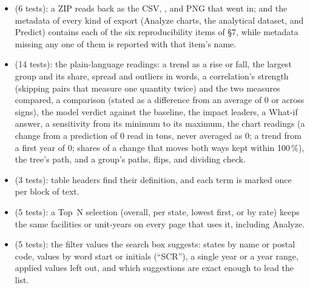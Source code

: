 \documentclass[11pt,a4paper]{article}
\begin{document}
\begin{itemize}
        maximum by the step, the baseline included once, a reversed range and a zero, negative,
        or empty step corrected and reported, the point limit); scenarios (scaled load and heat
        input, SCR and fuel set, never below zero, described in words) and the inputs each
        changes, named with their new and baseline values; group totals, as reported and under a
        scenario, equal to the sum of the units' predictions, and the group sensitivity and
        category curves; the tree's thresholds, between which its prediction is flat, and its
        path in words; a group's tree summary (every unit in one leaf as reported and with the
        change, leaf tons equal to the tree's totals, flips that account for every moved unit and
        the whole change, splits with units on both sides); what a scenario sets across a group;
        the years a What-if can use; and the signed and absolute error per fuel.
  \item {} (6 tests): a ZIP reads back as the CSV, ,
        and PNG that went in; and the metadata of every kind of export (Analyze charts, the
        analytical dataset, and Predict) contains each of the six reproducibility items of
        \S7, while metadata missing any one of them is reported with that item's name.
  \item {} (14 tests): the plain-language readings: a trend as a rise or
        fall, the largest group and its share, spread and outliers in words, a correlation's
        strength (skipping pairs that measure one quantity twice) and the two measures compared,
        a comparison (stated as a difference from an average of 0 or across signs), the model verdict against the baseline, the impact leaders, a What-if
        answer, a sensitivity from its minimum to its maximum, the chart readings (a change from a
        prediction of 0 read in tons, never averaged as 0; a trend from a first year of 0; shares of a change that moves both ways
        kept within 100\,\%), the tree's path, and a group's paths, flips, and dividing check.
  \item {} (3 tests): table headers find their definition, and each term is
        marked once per block of text.
  \item {} (5 tests): a Top~N selection (overall, per state, lowest
        first, or by rate) keeps the same facilities or unit-years on every page that uses it,
        including Analyze.
  \item {} (5 tests): the filter values the search box suggests:
        states by name or postal code, values by word start or initials (``SCR''), a single year
        or a year range, applied values left out, and which suggestions are exact enough to lead
        the list.
\end{itemize}
\end{document}
